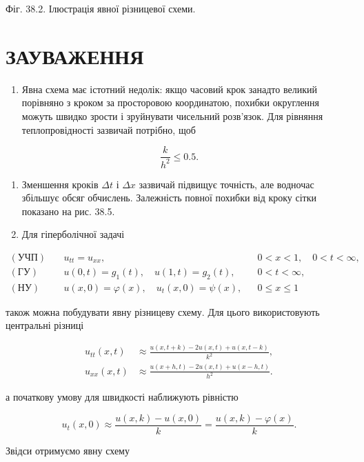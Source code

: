 \documentclass[
  ukrainian,
]{article}
\providecommand{\tightlist}{%
  \setlength{\itemsep}{0pt}\setlength{\parskip}{0pt}}
\begin{document}
Фіг. 38.2. Ілюстрація явної різницевої схеми.

\section{ЗАУВАЖЕННЯ}\label{ux437ux430ux443ux432ux430ux436ux435ux43dux43dux44f-13}

\begin{enumerate}
\def\labelenumi{\arabic{enumi}.}
\tightlist
\item
  Явна схема має істотний недолік: якщо часовий крок занадто великий
  порівняно з кроком за просторовою координатою, похибки округлення
  можуть швидко зрости і зруйнувати чисельний розв'язок. Для рівняння
  теплопровідності зазвичай потрібно, щоб
\end{enumerate}

\[\frac{k}{h^2}\le 0.5.\]

\begin{enumerate}
\def\labelenumi{\arabic{enumi}.}
\setcounter{enumi}{1}
\item
  Зменшення кроків \(\Delta t\) і \(\Delta x\) зазвичай підвищує
  точність, але водночас збільшує обсяг обчислень. Залежність повної
  похибки від кроку сітки показано на рис. 38.5.
\item
  Для гіперболічної задачі
\end{enumerate}

\[\begin{aligned}(\text{УЧП})\quad & u_{tt}=u_{xx}, && 0<x<1,\quad 0<t<\infty,\\(\text{ГУ})\quad & u(0,t)=g_1(t),\quad u(1,t)=g_2(t), && 0<t<\infty,\\(\text{НУ})\quad & u(x,0)=\varphi(x),\quad u_t(x,0)=\psi(x), && 0\le x\le 1\end{aligned}\]

також можна побудувати явну різницеву схему. Для цього використовують
центральні різниці

\[\begin{aligned}u_{tt}(x,t)&\approx \frac{u(x,t+k)-2u(x,t)+u(x,t-k)}{k^2},\\u_{xx}(x,t)&\approx \frac{u(x+h,t)-2u(x,t)+u(x-h,t)}{h^2}.\end{aligned}\]

а початкову умову для швидкості наближують рівністю

\[u_t(x,0)\approx \frac{u(x,k)-u(x,0)}{k}=\frac{u(x,k)-\varphi(x)}{k}.\]

Звідси отримуємо явну схему
\end{document}
